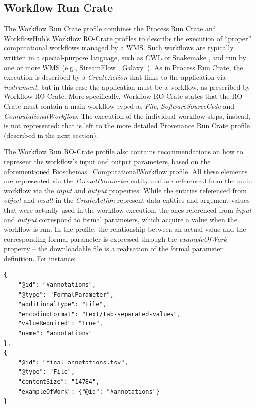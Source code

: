 \documentclass[10pt,letterpaper]{article}
\begin{document}
\subsection{Workflow Run Crate}\label{workflow-run-crate}

The Workflow Run Crate profile combines the Process Run Crate and WorkflowHub's Workflow RO-Crate \cite{Bacall 2022} profiles to describe the execution of “proper” computational workflows managed by a WMS.
Such workflows are typically written in a special-purpose language, such as CWL or Snakemake
\cite{Koster 2012}, and run by one or more WMS (e.g., StreamFlow
\cite{Colonnelli 2020}, Galaxy~\cite{Galaxy 2022}).
As in Process Run Crate, the execution is described by a \emph{CreateAction}
that links to the application via \emph{instrument}, but in this case the application must be a workflow, as prescribed by Workflow RO-Crate.
More specifically, Workflow RO-Crate states that the RO-Crate must contain a main workflow typed as \emph{File}, \emph{SoftwareSourceCode}
and \emph{ComputationalWorkflow}.
The execution of the individual workflow steps, instead, is not represented: that is left to the more detailed Provenance Run Crate profile (described in the next section).

The Workflow Run RO-Crate profile also contains recommendations on how to represent the workflow's input and output parameters, based on the aforementioned Bioschemas~\cite{Gray 2017} ComputationalWorkflow profile.
All these elements are represented via the \emph{FormalParameter} entity and are referenced from the main workflow via the \emph{input} and
\emph{output} properties.
While the entities referenced from
\emph{object} and \emph{result} in the \emph{CreateAction} represent data entities and argument values that were actually used in the workflow execution, the ones referenced from \emph{input} and
\emph{output} correspond to formal parameters, which acquire a value when the workflow is run.
In the profile, the relationship between an actual value and the corresponding formal parameter is expressed through the \emph{exampleOfWork} property -- the downloadable file is a realisation of the formal parameter definition.
For instance:

\begin{verbatim}
{
    "@id": "#annotations",
    "@type": "FormalParameter",
    "additionalType": "File",
    "encodingFormat": "text/tab-separated-values",
    "valueRequired": "True",
    "name": "annotations"
},
{
    "@id": "final-annotations.tsv",
    "@type": "File",
    "contentSize": "14784",
    "exampleOfWork": {"@id": "#annotations"}
}
\end{verbatim}
\end{document}
